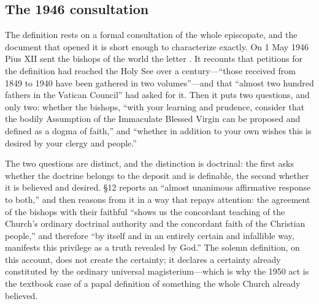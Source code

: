 \subsection*{The 1946 consultation}

The definition rests on a formal consultation of the whole episcopate,
and the document that opened it is short enough to characterize exactly.
On 1 May 1946 Pius XII sent the bishops of the world the letter
. It recounts that petitions for the
definition had reached the Holy See over a century---``those received
from 1849 to 1940 have been gathered in two volumes''---and that ``almost
two hundred fathers in the Vatican Council'' had asked for it. Then it
puts two questions, and only two: whether the bishops, ``with your
learning and prudence, consider that the bodily Assumption of the
Immaculate Blessed Virgin can be proposed and defined as a dogma of
faith,'' and ``whether in addition to your own wishes this is desired by
your clergy and people.''

The two questions are distinct, and the distinction is doctrinal: the
first asks whether the doctrine belongs to the deposit and is definable,
the second whether it is believed and desired.  \S12 reports an
``almost unanimous affirmative response to both,'' and then reasons from
it in a way that repays attention: the agreement of the bishops with
their faithful ``shows us the concordant teaching of the Church's
ordinary doctrinal authority and the concordant faith of the Christian
people,'' and therefore ``by itself and in an entirely certain and
infallible way, manifests this privilege as a truth revealed by
God.'' The solemn definition, on
this account, does not create the certainty; it declares a certainty
already constituted by the ordinary universal magisterium---which is why
the 1950 act is the textbook case of a papal definition of something the
whole Church already believed.

